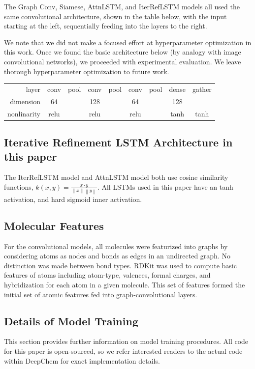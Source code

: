\documentclass[journal=jacsat,manuscript=article]{achemso}
\begin{document}
The Graph Conv, Siamese, AttnLSTM, and IterRefLSTM models all used the same convolutional architecture, shown in the table below, with the input starting at the left, sequentially feeding into the layers to the right.

We note that we did not make a focused effort at hyperparameter optimization in this work. Once we found the basic architecture below (by analogy with image convolutional networks), we proceeded with experimental evaluation. We leave thorough hyperparameter optimization to future work.

\begin{table}
    \begin{tabular}{ r | c | c | c | c | c | c | c | c |}
    \cline{2-9}
    layer & conv & pool & conv & pool & conv & pool & dense & gather\\
    dimension & 64 & & 128 & & 64 & & 128 &\\
    nonlinarity & relu & & relu & & relu & & tanh & tanh\\
    \cline{2-9}
    \end{tabular}
    
\end{table}

\subsection{Iterative Refinement LSTM Architecture in this paper}

The IterRefLSTM model and AttnLSTM model both use cosine similarity functions, $k(x,y) = \frac{x\cdot y}{ \left\|x\right\|\left\|y\right\|}$. All LSTMs used in this paper have an tanh activation, and hard sigmoid inner activation.

\subsection{Molecular Features}

For the convolutional models, all molecules were featurized into graphs by considering atoms as nodes and bonds as edges in an undirected graph. No distinction was made between bond types. RDKit \cite{landrum2016} was used to compute basic features of atoms including atom-type, valences, formal charges, and hybridization for each atom in a given molecule. This set  of features formed the initial set of atomic features fed into graph-convolutional layers. 

\subsection{Details of Model Training}
This section provides further information on model training procedures. All code for this paper is open-sourced, so we refer interested readers to the actual code within DeepChem for exact implementation details.
\end{document}
